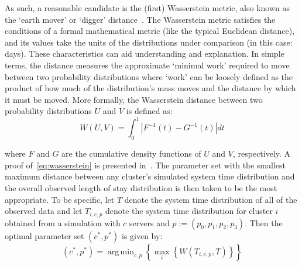 \documentclass[11pt]{article}
\DeclareMathOperator*{\argmin}{arg\,min}
\begin{document}
As such, a reasonable candidate is the (first) Wasserstein metric, also known as
the `earth mover' or `digger' distance~\cite{Vaserstein1969}. The Wasserstein
metric satisfies the conditions of a formal mathematical metric (like the
typical Euclidean distance), and its values take the units of the distributions
under comparison (in this case: days). These characteristics can aid
understanding and explanation. In simple terms, the distance measures the
approximate `minimal work' required to move between two probability
distributions where `work' can be loosely defined as the product of how much of
the distribution's mass moves and the distance by which it must be moved. More
formally, the Wasserstein distance between two probability distributions \(U\)
and \(V\) is defined as:
\begin{equation}\label{eq:wasserstein}
    W(U, V) = \int_{0}^{1} \left\vert F^{-1}(t) - G^{-1}(t) \right\vert dt
\end{equation}

\noindent where \(F\) and \(G\) are the cumulative density functions of \(U\)
and \(V\), respectively. A proof of~\eqref{eq:wasserstein} is presented
in~\cite{Ramdas2017}. The parameter set with the smallest maximum distance
between any cluster's simulated system time distribution and the overall
observed length of stay distribution is then taken to be the most appropriate.
To be specific, let \(T\) denote the system time distribution of all of the
observed data and let \(T_{i,c,p}\) denote the system time distribution for
cluster \(i\) obtained from a simulation with \(c\) servers and \(p :=
\left(p_0, p_1, p_2, p_3\right)\). Then the optimal parameter set \(\left(c^*,
p^*\right)\) is given by:
\begin{equation}\label{eq:parameters}
    \left(c^*, p^*\right) = \argmin_{c, p} \left\{%
        \max_{i} \left\{ W\left(T_{i,c,p}, T\right) \right\}%
    \right\}
\end{equation}
\end{document}
